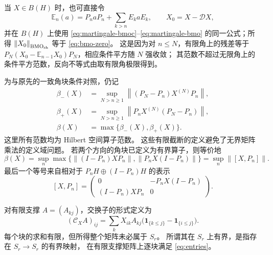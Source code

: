 \documentclass[UTF8,11pt,a4paper,fontset=fandol]{ctexart}
\theoremstyle{remark}
\newcommand{\DD}{\mathcal D}
\newcommand{\CC}{\mathcal C}
\newcommand{\norm}[1]{\left\lVert #1\right\rVert}
\numberwithin{equation}{section}
\begin{document}
当 $X\in B(H)$ 时，也可直接令
\[
 \mathbb E_n(a)=P_naP_n+\sum_{k>n}E_kaE_k,\qquad
 X_0=X-\DD X,
\]
并在 $B(H)$ 上使用 \eqref{eq:martingale-bmoc}--\eqref{eq:martingale-bmo}
的同一公式；所得 $\norm{X_0}_{\mathrm{BMO}_{\rm sh}}$
等于 \eqref{eq:bmo-zero}。
这是因为对 $n\leq N$，有限角上的残差等于
$P_N(X_0-\mathbb E_{n-1}X_0)P_N$，相应条件平方随 $N$ 强收敛；
其范数不超过无限角上的条件平方范数，反向不等式由取有限角极限得到。

\medskip
为与原先的一致角块条件对照，仍记
\begin{align}
 \beta_-(X)&=\sup_{N>n\geq1}
     \norm{(P_N-P_n)X^{(N)}P_n},\label{eq:beta-}\\
 \beta_+(X)&=\sup_{N>n\geq1}
     \norm{P_nX^{(N)}(P_N-P_n)},\label{eq:beta+}\\
 \beta(X)&=\max\{\beta_-(X),\beta_+(X)\}.\label{eq:beta}
\end{align}
这里所有范数均为 Hilbert 空间算子范数。
这些有限截断的定义避免了无界矩阵乘法的定义域问题。
若两个方向的角块已定义为有界算子，则等价地
\begin{equation}\label{eq:cut}
 \beta(X)=\sup_n\max\{
 \norm{(I-P_n)XP_n},\norm{P_nX(I-P_n)}\}
 =\sup_n\norm{[X,P_n]}.
\end{equation}
最后一个等号来自相对于 $P_nH\oplus(I-P_n)H$ 的表示
\[
 [X,P_n]=\begin{pmatrix}
 0&-P_nX(I-P_n)\\
 (I-P_n)XP_n&0
 \end{pmatrix}.
\]

对有限支撑 $A=(A_{kj})$，交换子的形式定义为
\begin{equation}\label{eq:entries}
 (\CC_X A)_{ij}
 =\sum_k X_{ik}A_{kj}
 \bigl(\mathbf1_{\{k\leq j\}}-\mathbf1_{\{i\leq j\}}\bigr).
\end{equation}
每个块的求和有限，但所得整个矩阵未必属于 $S_r$。
所谓其在 $S_r$ 上有界，是指存在 $S_r\to S_r$ 的有界映射，
在有限支撑矩阵上逐块满足 \eqref{eq:entries}。
\end{document}
